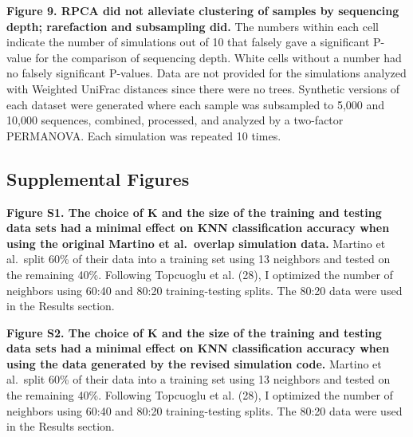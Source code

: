 \documentclass[
  11pt,
]{article}
\begin{document}
\textbf{Figure 9. RPCA did not alleviate clustering of samples by
sequencing depth; rarefaction and subsampling did.} The numbers within
each cell indicate the number of simulations out of 10 that falsely gave
a significant P-value for the comparison of sequencing depth. White
cells without a number had no falsely significant P-values. Data are not
provided for the simulations analyzed with Weighted UniFrac distances
since there were no trees. Synthetic versions of each dataset were
generated where each sample was subsampled to 5,000 and 10,000
sequences, combined, processed, and analyzed by a two-factor PERMANOVA.
Each simulation was repeated 10 times.

\subsection{Supplemental Figures}\label{supplemental-figures}

\textbf{Figure S1. The choice of K and the size of the training and
testing data sets had a minimal effect on KNN classification accuracy
when using the original Martino et al.~overlap simulation data.} Martino
et al.~split 60\% of their data into a training set using 13 neighbors
and tested on the remaining 40\%. Following Topcuoglu et al. (28), I
optimized the number of neighbors using 60:40 and 80:20 training-testing
splits. The 80:20 data were used in the Results section.

\textbf{Figure S2. The choice of K and the size of the training and
testing data sets had a minimal effect on KNN classification accuracy
when using the data generated by the revised simulation code.} Martino
et al.~split 60\% of their data into a training set using 13 neighbors
and tested on the remaining 40\%. Following Topcuoglu et al. (28), I
optimized the number of neighbors using 60:40 and 80:20 training-testing
splits. The 80:20 data were used in the Results section.
\end{document}
